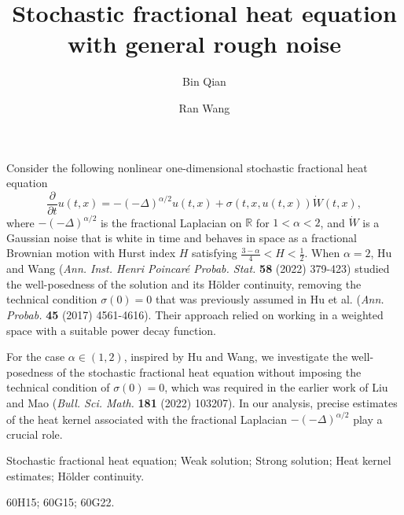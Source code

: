 \documentclass[11pt,reqno]{amsart}
\title[Stochastic  fractional  heat equation  with spatially rough noise]{Stochastic fractional heat equation  with general rough noise}
\date{}
\numberwithin{equation}{section}
\newcommand{\1}{{\bf 1}}
\newcommand{\2}{{\bf 2}}
\begin{document}
       \author[B. Qian]{Bin Qian}
    \address[]{Bin Qian, Department of Mathematics and Statistics, Suzhou University of Technology, Changshu, Jiangsu, 215500,  China.}
 

    \author[R. Wang]{Ran Wang}
    \address[]{Ran Wang, School of Mathematics and Statistics,  Wuhan University,  Wuhan, 430072,
    China.}

 

    \maketitle
     Consider the following nonlinear one-dimensional stochastic  fractional  heat equation  
$$\frac{\partial }{\partial t}u(t, x)= -(-\Delta)^{\alpha/2}u(t, x) +\sigma(t,x,u(t,x)) \dot{W}(t, x), $$ 
 where $-(-\Delta)^{\alpha/2}$  is the fractional Laplacian   on $\mathbb R$ for   $1<\alpha<2$,   and   $\dot{W}$ is a Gaussian noise that is  white in time and behaves in space as a fractional Brownian motion  with Hurst index $H$ satisfying  $\frac{3-\alpha}{4}<H<\frac12$.   
 When $\alpha=2$, Hu and Wang ({\it Ann. Inst. Henri Poincar\'e Probab. Stat.} {\bf 58} (2022) 379-423) studied the well-posedness of the solution and its  H\"older continuity, removing the technical  condition $\sigma(0)=0$ that was previously assumed in Hu et al.  ({\it Ann. Probab.} {\bf 45} (2017) 4561-4616). Their approach relied on working in a weighted space with a suitable power decay function. 
 
 
 For  the case $\alpha\in (1,2)$, inspired by Hu and Wang, we  investigate  the well-posedness of the  stochastic  fractional  heat equation without imposing  the technical  condition of $\sigma(0)=0$, which was required  in the earlier work of    Liu and Mao  ({\it Bull. Sci. Math.}  {\bf181}    (2022)  103207).  In our analysis,   precise estimates of the heat kernel associated with the fractional Laplacian $-(-\Delta)^{\alpha/2}$  play a crucial role. 
 
 
 
      \vskip0.3cm
  {Stochastic  fractional heat equation; Weak solution; Strong solution; Heat kernel estimates;  H\"older continuity.}
 \vskip0.3cm

  
 {60H15; 60G15; 60G22.}
        \vskip0.5cm


\end{document}
